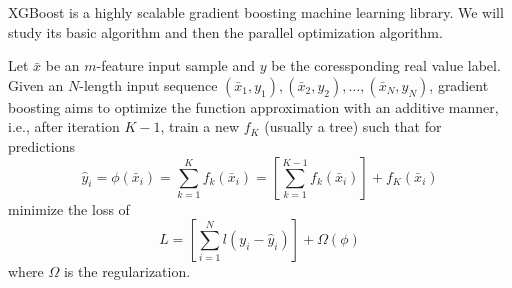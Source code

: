 


XGBoost is a highly scalable gradient boosting machine learning library. We will
study its basic algorithm and then the parallel optimization algorithm.


Let $\bar{x}$ be an $m$-feature input sample and $y$ be the coressponding real value label.
Given an $N$-length input sequence $(\bar{x}_1, y_1), (\bar{x}_2, y_2), \ldots, (\bar{x}_N,y_N)$,
gradient boosting aims to optimize the function
approximation with an additive manner, i.e., after iteration $ K-1 $, train a
new $ f_{K }$ (usually a tree) such that for predictions
$$
{\hat{y}}_i = \phi(\bar{x}_i)
= \sum_{k=1}^K f_{k} (\bar{x}_i)
= \left[ \sum_{k=1}^{K-1} f_{k} (\bar{x}_i) \right] + f_K(\bar{x}_i)
$$
minimize the loss of
$$
L = \left[
  \sum_{i=1}^N l (y_i - \hat{y}_i)
    \right]
+ \Omega(\phi)
$$
where $\Omega$ is the regularization.

\vfill
\bye
